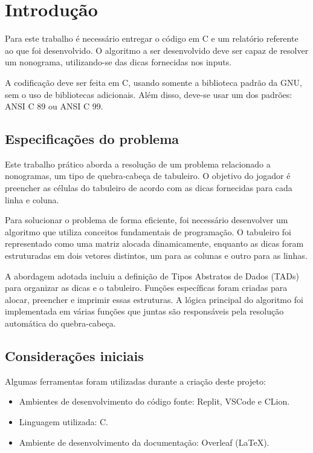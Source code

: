 \documentclass{article}
\begin{document}

\section{Introdução}
\indent Para este trabalho é necessário entregar o código em C e um relatório referente ao que foi desenvolvido. O algoritmo a ser desenvolvido deve ser capaz de resolver um nonograma, utilizando-se das dicas fornecidas nos inputs.

A codificação deve ser feita em C, usando somente a biblioteca padrão da GNU, sem o uso de bibliotecas adicionais. Além disso, deve-se usar um dos padrões: ANSI C 89 ou ANSI C 99.

\subsection{Especificações do problema}

Este trabalho prático aborda a resolução de um problema relacionado a nonogramas, um tipo de quebra-cabeça de tabuleiro. O objetivo do jogador é preencher as células do tabuleiro de acordo com as dicas fornecidas para cada linha e coluna.

Para solucionar o problema de forma eficiente, foi necessário desenvolver um algoritmo que utiliza conceitos fundamentais de programação. O tabuleiro foi representado como uma matriz alocada dinamicamente, enquanto as dicas foram estruturadas em dois vetores distintos, um para as colunas e outro para as linhas.

A abordagem adotada incluiu a definição de Tipos Abstratos de Dados (TADs) para organizar as dicas e o tabuleiro. Funções específicas foram criadas para alocar, preencher e imprimir essas estruturas. A lógica principal do algoritmo foi implementada em várias funções que juntas são responsáveis pela resolução automática do quebra-cabeça.


\subsection{Considerações iniciais}

Algumas ferramentas foram utilizadas durante a criação deste projeto:

\begin{itemize}
    \item Ambientes de desenvolvimento do código fonte: Replit, VSCode e CLion.
    \item Linguagem utilizada: C.
    \item Ambiente de desenvolvimento da documentação: Overleaf (LaTeX).
\end{itemize}
\end{document}
